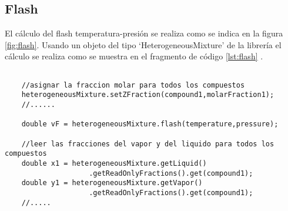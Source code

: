 \subsection{Flash}\label{subsec:flash}


	El cálculo del flash temperatura-presión se realiza como se indica en la figura \ref{fig:flash}. Usando un objeto del tipo `HeterogeneousMixture' de la librería \Materia el cálculo se realiza como se muestra en el fragmento de código \ref{lst:flash} .

\begin{lstlisting}[label={lst:flash},caption={Cálculo del flash temperatura-presión.}]

	//asignar la fraccion molar para todos los compuestos
	heterogeneousMixture.setZFraction(compound1,molarFraction1);
	//...... 

	double vF = heterogeneousMixture.flash(temperature,pressure);

	//leer las fracciones del vapor y del liquido para todos los compuestos
	double x1 = heterogeneousMixture.getLiquid()
					.getReadOnlyFractions().get(compound1);
	double y1 = heterogeneousMixture.getVapor()
					.getReadOnlyFractions().get(compound1);
	//.....
\end{lstlisting}

